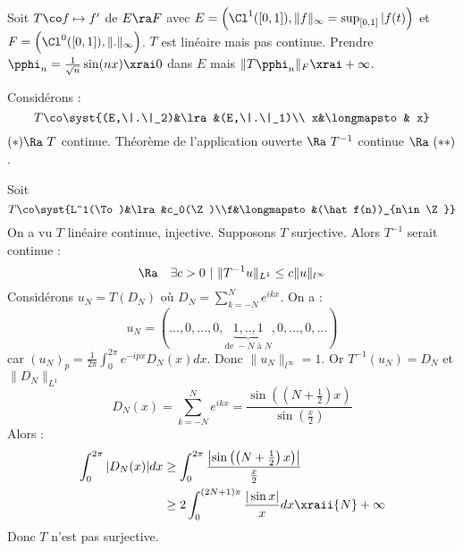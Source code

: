 \cexe Soit $T\co f\mapsto f'$ de $E\ra F$ avec $E=\Big(\Cl^1([0,1]),\|f\|_\infty=\sup_{[0,1]}|f(t)\Big)$ et $F=\Big(\Cl^0([0,1]),\|.\|_\infty\Big)$. $T$ est linéaire mais pas continue. Prendre $\pphi_n=\frac{1}{\sqrt n}\sin(nx)\xrai 0$ dans $E$ mais $\|T\pphi_n\|_F\xrai +\infty$.

\prvv
Considérons :
$$T\co\syst{(E,\|.\|_2)&\lra &(E,\|.\|_1)\\ x&\longmapsto& x}$$
$(\ast)\Ra\ T$ continue. Théorème de l'application ouverte $\Ra\ T^{-1}$ continue $\Ra\ (\ast\ast)$.
\prvf

\exe Soit 
$$T\co\syst{L^1(\To)&\lra&c_0(\Z)\\f&\longmapsto&(\hat f(n))_{n\in\Z}}$$
On a vu $T$  linéaire continue, injective. Supposons $T$ surjective. Alors $T^{-1}$ serait continue :
$$\Ra\quad\exists c>0\ |\ \|T^{-1}u\|_{L^1}\le c\|u\|_{l^\infty}$$
Considérons $u_N=T(D_N)$ où $D_N=\sum_{k=-N}^N e^{ikx}$. On a :
$$u_N=(...,0,...,0,\underset{\text{de }-N\text{ à }N}{\underbrace{1,..,1}},0,...,0,...)$$
car $(u_N)_p=\frac{1}{2\pi}\int_0^{2\pi}e^{-ipx}D_N(x)dx$. Donc $\|u_N\|_{l^\infty}=1$.
\dl Or $T^{-1}(u_N)=D_N$ et $\|D_N\|_{L^1}$
  $$D_N(x)=\sum_{k=-N}^N e^{ikx}=\frac{\sin\left(\left(N+\frac 1 2\right)x\right)}{\sin\left(\frac x 2\right)}$$
  Alors :
\begin{align*}
  \int_0^{2\pi}|D_N(x)|dx&\ge\int_0^{2\pi}\frac{\left|\sin\left(\left(N+\frac 1 2\right)x\right)\right|}{\frac x 2}\\
  &\ge 2\int_0^{(2N+1)\pi}\frac{|\sin x|}{x}dx\xraii{N}+\infty
\end{align*}
Donc $T$ n'est pas surjective.

